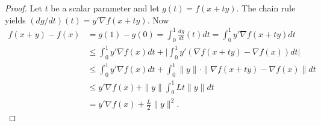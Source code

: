 \documentclass[11pt]{article}
\begin{document}
\begin{proof}
Let $t$ be a scalar parameter and let $g(t)=f(x+ty)$. The chain rule yields $(dg/dt)(t) = y'\nabla f(x+ty)$. Now
\begin{equation*}
\begin{split}
f(x+y) - f(x)
&= g(1) - g(0)
= \int_0^1 \frac{dg}{dt}(t)dt = \int_0^1 y' \nabla f(x+ty)dt \\
&\leq \int_0^1 y'\nabla f(x) dt + \Bigg| \int_0^1 y'(\nabla f(x+ty) - \nabla f(x))dt \Bigg| \\
&\leq \int_0^1 y'\nabla f(x) dt +  \int_0^1 \|y\| \cdot \|\nabla f(x+ty) - \nabla f(x)\|dt \\
&\leq y'\nabla f(x) + \|y\| \int_0^1 Lt\|y\|dt \\
&= y'\nabla f(x) + \frac{L}{2} \|y\|^2.
\end{split}
\end{equation*}
\end{proof}

\end{document}
